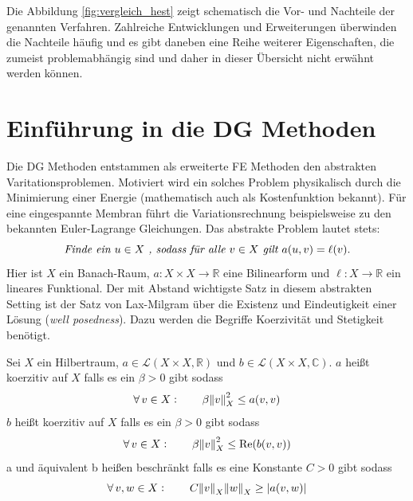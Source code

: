 Die Abbildung \ref{fig:vergleich_hest} zeigt schematisch die Vor- und Nachteile der genannten Verfahren. Zahlreiche Entwicklungen und Erweiterungen überwinden die Nachteile häufig und es gibt daneben eine Reihe weiterer Eigenschaften, die zumeist problemabhängig sind und daher in dieser Übersicht nicht erwähnt werden können.

\section{Einführung in die DG Methoden}
Die DG Methoden entstammen als erweiterte FE Methoden den abstrakten Varitationsproblemen. Motiviert wird ein solches Problem physikalisch durch die Minimierung einer Energie (mathematisch auch als Kostenfunktion bekannt). Für eine eingespannte Membran führt die Variationsrechnung beispielsweise zu den bekannten Euler-Lagrange Gleichungen. Das abstrakte Problem lautet stets:
\begin{equation}\label{varprob}
      \emph{Finde ein } u\in X\emph{ , sodass für alle } v\in X \emph{ gilt } a(u,v) = \ell(v).
\end{equation}
Hier ist $X$ ein Banach-Raum, $a:X\times X \rightarrow \mathbb{R}$ eine Bilinearform und ${\ell:X\rightarrow \mathbb{R}}$ ein lineares Funktional.
Der mit Abstand wichtigste Satz in diesem abstrakten Setting ist der Satz von Lax-Milgram \cite{buchPietro} über die Existenz und Eindeutigkeit einer Lösung (\emph{well posedness}). Dazu werden die Begriffe Koerzivität und Stetigkeit benötigt.
\begin{definition} \label{def:koerz}
  Sei $X$ ein Hilbertraum, $a \in \mathcal{L}(X\times X, \mathbb{R})$ und $b \in \mathcal{L}(X\times X, \mathbb{C})$. $a$ heißt koerzitiv auf $X$ falls es ein $\beta>0$ gibt sodass
  \begin{equation}
    \forall \, v \in X : \qquad \beta\norm{v}^2_X \leq a(v,v)
  \end{equation}
  $b$ heißt koerzitiv auf $X$ falls es ein $\beta>0$ gibt sodass
  \begin{equation}
    \forall \, v \in X : \qquad \beta\norm{v}^2_X \leq  \operatorname{Re}(b(v,v))
  \end{equation}
  a und äquivalent b heißen beschränkt falls es eine Konstante $C>0$ gibt sodass
  \begin{equation}
    \forall \, v,w \in X : \qquad C\norm{v}_X \norm{w}_X \geq |a(v,w)|
  \end{equation}
\end{definition}
